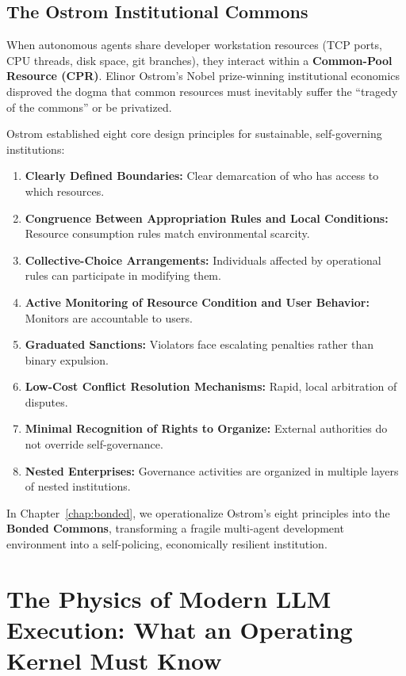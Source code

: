 \documentclass[11pt,a4paper]{article}
\begin{document}
\subsection{The Ostrom Institutional Commons}

When autonomous agents share developer workstation resources (TCP ports, CPU threads, disk space, git branches), they interact within a \textbf{Common-Pool Resource (CPR)}. Elinor Ostrom's Nobel prize-winning institutional economics~ disproved the dogma that common resources must inevitably suffer the ``tragedy of the commons'' or be privatized.

Ostrom established eight core design principles for sustainable, self-governing institutions:
\begin{enumerate}[leftmargin=1.8em,itemsep=2pt]
  \item \textbf{Clearly Defined Boundaries:} Clear demarcation of who has access to which resources.
  \item \textbf{Congruence Between Appropriation Rules and Local Conditions:} Resource consumption rules match environmental scarcity.
  \item \textbf{Collective-Choice Arrangements:} Individuals affected by operational rules can participate in modifying them.
  \item \textbf{Active Monitoring of Resource Condition and User Behavior:} Monitors are accountable to users.
  \item \textbf{Graduated Sanctions:} Violators face escalating penalties rather than binary expulsion.
  \item \textbf{Low-Cost Conflict Resolution Mechanisms:} Rapid, local arbitration of disputes.
  \item \textbf{Minimal Recognition of Rights to Organize:} External authorities do not override self-governance.
  \item \textbf{Nested Enterprises:} Governance activities are organized in multiple layers of nested institutions.
\end{enumerate}

In Chapter~\ref{chap:bonded}, we operationalize Ostrom's eight principles into the \textbf{Bonded Commons}, transforming a fragile multi-agent development environment into a self-policing, economically resilient institution.

\section{The Physics of Modern LLM Execution: What an Operating Kernel Must Know}\label{sec:prereq-llm-physics}
\end{document}
